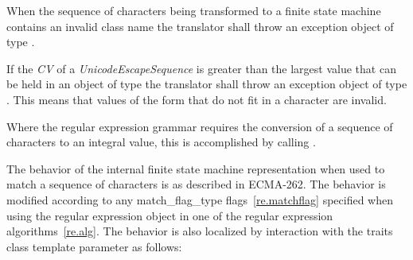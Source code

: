 \pnum
{}%
When the sequence of characters being transformed to a finite state
machine contains an invalid class name the translator shall throw an
exception object of type . 

\pnum
{}%
If the \textit{CV} of a \textit{UnicodeEscapeSequence} is greater than the largest
value that can be held in an object of type  the translator shall
throw an exception object of type . \enternote
This means that values of the form  that do not fit in
a character are invalid.  \exitnote

\pnum
Where the regular expression grammar requires the conversion of a sequence of characters
to an integral value, this is accomplished by calling .

\pnum
{}%
The behavior of the internal finite state machine representation when used to match a
sequence of characters is as described in ECMA-262.
The behavior is modified according
to any match_flag_type flags~\ref{re.matchflag} specified when using the regular expression
object in one of the regular expression algorithms~\ref{re.alg}. The behavior is also
localized by interaction with the traits class template parameter as follows:

